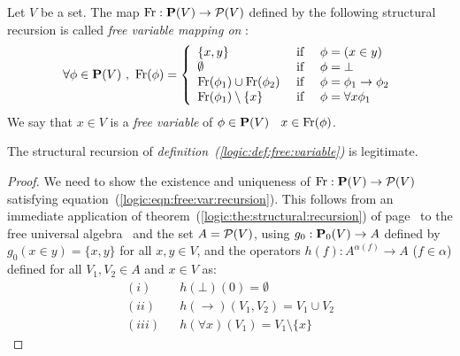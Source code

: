 \begin{defin}\label{logic:def:free:variable}
    Let $V$ be a set. The map $\mbox{\rm Fr}:\mbox{${\bf P}(V)$}\to {\cal P}(V)$ defined by the
    following structural recursion is called {\em free variable mapping on \pv}:
    \begin{equation}\label{logic:eqn:free:var:recursion}
        \forall\phi\in\pv\ ,\ 
            \free(\phi) =
                \left\{\begin{array}{lcl}
                    \{x,y\}&\mbox{\ if\ }&\phi=(x\in y)
                    \\
                    \emptyset&\mbox{\ if\ }&\phi=\bot
                    \\
                    \free(\phi_{1})\cup\free(\phi_{2}) 
                        &\mbox{\ if\ }&
                    \phi=\phi_{1}\to\phi_{2}
                    \\
                    \free(\phi_{1})\setminus\{x\}
                        &\mbox{\ if\ }&
                    \phi=\forall x\phi_{1}
                \end{array}\right.
    \end{equation}
    We say that $x\in V$ is a {\em free variable} of $\phi\in\mbox{${\bf P}(V)$}$ 
    \ifand\ $x\in\mbox{\rm Fr}(\phi)$.
\end{defin}
\begin{prop}\label{logic:prop:free:variable}
    The structural recursion of {\em definition~(\ref{logic:def:free:variable})} 
    is legitimate.
\end{prop}
\begin{proof}
We need to show the existence and uniqueness of $\mbox{\rm Fr}:\mbox{${\bf P}(V)$}\to{\cal
P}(V)$ satisfying equation~(\ref{logic:eqn:free:var:recursion}).
This follows from an immediate application of
theorem~(\ref{logic:the:structural:recursion}) of
page~\pageref{logic:the:structural:recursion} to the free universal
algebra \pv\ and the set $A={\cal P}(V)$, using $g_{0}:\mbox{${\bf P}_{0}(V)$}\to A$
defined by $g_{0}(x\in y)=\{x,y\}$ for all $x,y\in V$, and the
operators $h(f):A^{\alpha(f)}\to A$ ($f\in\alpha$) defined for all
$V_{1},V_{2}\in A$ and $x\in V$ as:
    \begin{eqnarray*}
    (i)&&h(\bot)(0)=\emptyset\\
    (ii)&&h(\to)(V_{1},V_{2})=V_{1}\cup V_{2}\\
    (iii)&&h(\forall x)(V_{1})=V_{1}\setminus\{x\}
    \end{eqnarray*}
\end{proof}


